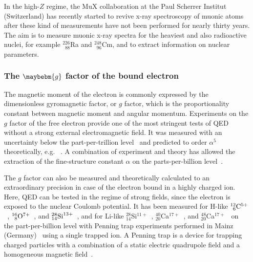 In the high-$Z$ regime, the MuX collaboration at the Paul Scherrer Institut (Switzerland) has recently started to revive x-ray spectroscopy of muonic atoms after these kind of measurements have not been performed for nearly thirty years.
The aim is to measure muonic x-ray spectra for the heaviest and also radioactive nuclei, for example $^{226}_{\phantom{1}88}$Ra and $^{248}_{\phantom{1}96}$Cm, and to extract information on nuclear parameters. 

\subsubsection*{The $\maybebm{g}$ factor of the bound electron}
The magnetic moment of the electron is commonly expressed by the dimensionless gyromagnetic factor, or $g$ factor, which is the proportionality constant between magnetic moment and angular momentum. Experiments on the $g$ factor of the free electron provide one of the most stringent tests of QED without a strong external electromagnetic field. It was measured with an uncertainty below the part-per-trillion level~\cite{odom2006,hanneke2008} and predicted to order $\alpha^5$ theoretically, e.g.~  \cite{schwinger1948,Peterman57,Sommerfield1957,Sommerfield58,Laporta96,kinoshita2006,aoyama2007,aoyama2015,aoyama2017}. A combination of experiment and theory has allowed the extraction of the fine-structure constant $\alpha$ on the parts-per-billion level~\cite{gabrielse2006,gabrielse2007}.

The $g$ factor can also be measured and theoretically calculated to an extraordinary precision in case of the electron bound in a highly charged ion. Here, QED can be tested in the regime of strong fields, since the electron is exposed to the nuclear Coulomb potential. It has been measured for H-like $^{12}_{\phantom{0}6}\rm{C}^{5+}$~\cite{Haffner2000,Sturm2014}, $^{16}_{\phantom{0}8}\rm{O}^{7+}$~\cite{Verdu2004}, and $^{28}_{14}\rm{Si}^{13+}$~\cite{Sturm2011}, and for Li-like $^{28}_{14}$Si$^{11+}$~\cite{sturm2013}, $^{40}_{20}$Ca$^{17+}$~\cite{Kohler2016}, and $^{48}_{20}$Ca$^{17+}$~\cite{Kohler2016} on the part-per-billion level with Penning trap experiments performed in Mainz (Germany)~\cite{sturm2017} using a single trapped ion. A Penning trap is a device for trapping charged particles with a combination of a static electric quadrupole field and a homogeneous magnetic field~\cite{annphysgfactor,geoniumtheory}. 

